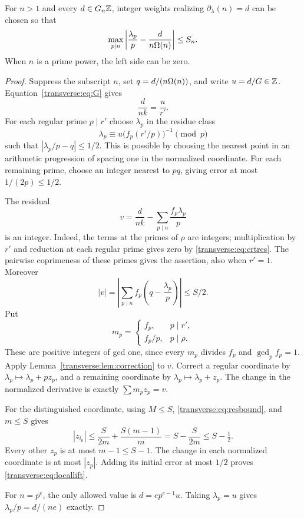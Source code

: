 \begin{theorem}\label{transverse:thm:local}
For $n>1$ and every $d\in G_n\mathbb Z$, integer weights realizing $\partial_\lambda(n)=d$ can be chosen so that
\begin{equation}\label{transverse:eq:locallift}
 \max_{p\mid n}\left|\frac{\lambda_p}{p}-\frac{d}{n\Omega(n)}\right|\le S_n.
\end{equation}
When $n$ is a prime power, the left side can be zero.
\end{theorem}
\begin{proof}
Suppress the subscript $n$, set $q=d/(n\Omega(n))$, and write $u=d/G\in\mathbb Z$. Equation~\eqref{transverse:eq:G} gives
\[
 \frac{d}{nk}=\frac{u}{r'}.
\]
For each regular prime $p\mid r'$ choose $\lambda_p$ in the residue class
\begin{equation}\label{transverse:eq:crtres}
 \lambda_p\equiv u\bigl(f_p(r'/p)\bigr)^{-1}\pmod p
\end{equation}
such that $|\lambda_p/p-q|\le1/2$. This is possible by choosing the nearest point in an arithmetic progression of spacing one in the normalized coordinate. For each remaining prime, choose an integer nearest to $pq$, giving error at most $1/(2p)\le1/2$.

The residual
\[
 v=\frac{d}{nk}-\sum_{p\mid n}\frac{f_p\lambda_p}{p}
\]
is an integer. Indeed, the terms at the primes of $\rho$ are integers; multiplication by $r'$ and reduction at each regular prime gives zero by \eqref{transverse:eq:crtres}. The pairwise coprimeness of these primes gives the assertion, also when $r'=1$. Moreover
\begin{equation}\label{transverse:eq:resbound}
 |v|=\left|\sum_{p\mid n} f_p\left(q-\frac{\lambda_p}{p}\right)\right|\le S/2.
\end{equation}
Put
\[
 m_p=\begin{cases}f_p,&p\mid r',\\ f_p/p,&p\mid\rho.\end{cases}
\]
These are positive integers of gcd one, since every $m_p$ divides $f_p$ and $\gcd_p f_p=1$. Apply Lemma~\ref{transverse:lem:correction} to $v$. Correct a regular coordinate by $\lambda_p\mapsto\lambda_p+pz_p$, and a remaining coordinate by $\lambda_p\mapsto\lambda_p+z_p$. The change in the normalized derivative is exactly $\sum m_pz_p=v$.

For the distinguished coordinate, using $M\le S$, \eqref{transverse:eq:resbound}, and $m\le S$ gives
\[
 |z_{i_0}|\le\frac{S}{2m}+\frac{S(m-1)}m
 =S-\frac{S}{2m}\le S-\tfrac12.
\]
Every other $z_p$ is at most $m-1\le S-1$. The change in each normalized coordinate is at most $|z_p|$. Adding its initial error at most $1/2$ proves \eqref{transverse:eq:locallift}.

For $n=p^e$, the only allowed value is $d=ep^{e-1}u$. Taking $\lambda_p=u$ gives $\lambda_p/p=d/(ne)$ exactly.
\end{proof}
